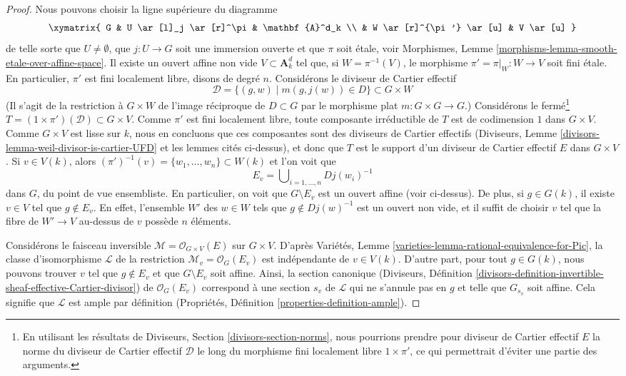 \begin{proof}
\medskip\noindent
Nous pouvons choisir la ligne supérieure du diagramme
$$
\xymatrix{
G & U \ar[l]_j \ar[r]^\pi & \mathbf{A}^d_k \\
& W \ar[r]^{\pi'} \ar[u] & V \ar[u]
}
$$
de telle sorte que $U \not = \emptyset$, que $j : U \to G$ soit une immersion ouverte et que
$\pi$ soit \'etale, voir
Morphismes, Lemme \ref{morphisms-lemma-smooth-etale-over-affine-space}.
Il existe un ouvert affine non vide $V \subset \mathbf{A}^d_k$ tel que,
si $W = \pi^{-1}(V)$, le morphisme $\pi' = \pi|_W : W \to V$ soit fini \'etale.
En particulier, $\pi'$ est fini localement libre, disons de degré $n$.
Considérons le diviseur de Cartier effectif
$$
\mathcal{D} = \{(g, w) \mid m(g, j(w)) \in D\} \subset G \times W
$$
(Il s'agit de la restriction à $G \times W$ de l'image réciproque de $D \subset G$
par le morphisme plat $m : G \times G \to G$.)
Considérons le fermé\footnote{En utilisant les résultats
de Diviseurs, Section \ref{divisors-section-norms},
nous pourrions prendre pour diviseur de Cartier effectif
$E$ la norme du diviseur de Cartier effectif $\mathcal{D}$
le long du morphisme fini localement libre $1 \times \pi'$, ce qui permettrait d'éviter
une partie des arguments.}
$T = (1 \times \pi')(\mathcal{D}) \subset G \times V$.
Comme $\pi'$ est fini localement libre, toute composante irréductible
de $T$ est de codimension $1$ dans $G \times V$. Comme $G \times V$
est lisse sur $k$, nous en concluons que ces composantes sont des diviseurs de Cartier
effectifs (Diviseurs, Lemme \ref{divisors-lemma-weil-divisor-is-cartier-UFD}
et les lemmes cités ci-dessus),
et donc que $T$ est le support d'un diviseur de Cartier effectif
$E$ dans $G \times V$. Si $v \in V(k)$, alors
$(\pi')^{-1}(v) = \{w_1, \ldots, w_n\} \subset W(k)$ et l'on voit que
$$
E_v = \bigcup\nolimits_{i = 1, \ldots, n} D j(w_i)^{-1}
$$
dans $G$, du point de vue ensembliste. En particulier, on voit que $G \setminus E_v$
est un ouvert affine (voir ci-dessus).
De plus, si $g \in G(k)$, il existe $v \in V$
tel que $g \not \in E_v$. En effet, l'ensemble $W'$ des $w \in W$ tels que
$g \not \in Dj(w)^{-1}$ est un ouvert non vide, et il suffit de choisir $v$
tel que la fibre de $W' \to V$ au-dessus de $v$ possède $n$ éléments.

\medskip\noindent
Considérons le faisceau inversible
$\mathcal{M} = \mathcal{O}_{G \times V}(E)$ sur $G \times V$.
D'après Variétés, Lemme \ref{varieties-lemma-rational-equivalence-for-Pic},
la classe d'isomorphisme $\mathcal{L}$ de la restriction
$\mathcal{M}_v = \mathcal{O}_G(E_v)$ est indépendante de $v \in V(k)$.
D'autre part, pour tout $g \in G(k)$, nous pouvons trouver $v$
tel que $g \not \in E_v$ et que $G \setminus E_v$
soit affine. Ainsi, la section canonique
(Diviseurs, Définition
\ref{divisors-definition-invertible-sheaf-effective-Cartier-divisor})
de $\mathcal{O}_G(E_v)$
correspond à une section $s_v$ de $\mathcal{L}$ qui ne
s'annule pas en $g$ et telle que $G_{s_v}$ soit affine.
Cela signifie que $\mathcal{L}$ est ample par définition
(Propriétés, Définition \ref{properties-definition-ample}).
\end{proof}

